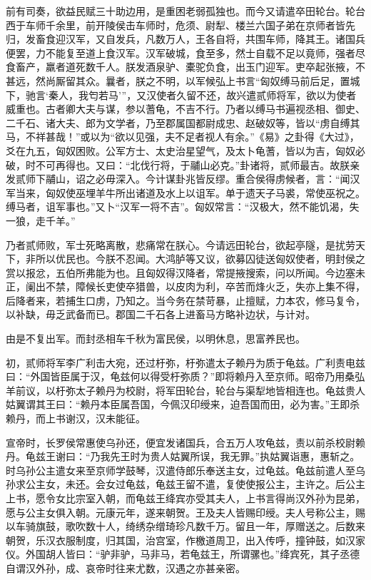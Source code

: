 \documentclass[]{article}
\begin{document}
前有司奏，欲益民赋三十助边用，是重困老弱孤独也。而今又请遣卒田轮台。轮台西于车师千余里，前开陵侯击车师时，危须、尉犁、楼兰六国子弟在京师者皆先归，发畜食迎汉军，又自发兵，凡数万人，王各自将，共围车师，降其王。诸国兵便罢，力不能复至道上食汉军。汉军破城，食至多，然士自载不足以竟师，强者尽食畜产，羸者道死数千人。朕发酒泉驴、橐驼负食，出玉门迎军。吏卒起张掖，不甚远，然尚厮留其众。曩者，朕之不明，以军候弘上书言``匈奴缚马前后足，置城下，驰言`秦人，我匄若马'''，又汉使者久留不还，故兴遣贰师将军，欲以为使者威重也。古者卿大夫与谋，参以蓍龟，不吉不行。乃者以缚马书遍视丞相、御史、二千石、诸大夫、郎为文学者，乃至郡属国都尉成忠、赵破奴等，皆以``虏自缚其马，不祥甚哉！''或以为``欲以见强，夫不足者视人有余。''《易》之卦得《大过》，爻在九五，匈奴困败。公军方士、太史治星望气，及太卜龟蓍，皆以为吉，匈奴必破，时不可再得也。又曰：``北伐行将，于鬴山必克。''卦诸将，贰师最吉。故朕亲发贰师下鬴山，诏之必毋深入。今计谋卦兆皆反缪。重合侯得虏候者，言：``闻汉军当来，匈奴使巫埋羊牛所出诸道及水上以诅军。单于遗天子马裘，常使巫祝之。缚马者，诅军事也。''又卜``汉军一将不吉''。匈奴常言：``汉极大，然不能饥渴，失一狼，走千羊。''

乃者贰师败，军士死略离散，悲痛常在朕心。今请远田轮台，欲起亭隧，是扰劳天下，非所以优民也。今朕不忍闻。大鸿胪等又议，欲募囚徒送匈奴使者，明封侯之赏以报忿，五伯所弗能为也。且匈奴得汉降者，常提掖搜索，问以所闻。今边塞未正，阑出不禁，障候长吏使卒猎兽，以皮肉为利，卒苦而烽火乏，失亦上集不得，后降者来，若捕生口虏，乃知之。当今务在禁苛暴，止擅赋，力本农，修马复令，以补缺，毋乏武备而已。郡国二千石各上进畜马方略补边状，与计对。

由是不复出军。而封丞相车千秋为富民侯，以明休息，思富养民也。

初，贰师将军李广利击大宛，还过杅弥，杅弥遣太子赖丹为质于龟兹。广利责电兹曰：``外国皆臣属于汉，龟兹何以得受杅弥质？''即将赖丹入至京师。昭帝乃用桑弘羊前议，以杅弥太子赖丹为校尉，将军田轮台，轮台与渠犁地皆相连也。龟兹贵人姑翼谓其王曰：``赖丹本臣属吾国，今佩汉印绶来，迫吾国而田，必为害。''王即杀赖丹，而上书谢汉，汉未能征。

宣帝时，长罗侯常惠使乌孙还，便宜发诸国兵，合五万人攻龟兹，责以前杀校尉赖丹。龟兹王谢曰：``乃我先王时为贵人姑翼所误，我无罪。''执姑翼诣惠，惠斩之。时乌孙公主遣女来至京师学鼓琴，汉遣侍郎乐奉送主女，过龟兹。龟兹前遣人至乌孙求公主女，未还。会女过龟兹，龟兹王留不遣，复使使报公主，主许之。后公主上书，愿令女比宗室入朝，而龟兹王绛宾亦受其夫人，上书言得尚汉外孙为昆弟，愿与公主女俱入朝。元康元年，遂来朝贺。王及夫人皆赐印绶。夫人号称公主，赐以车骑旗鼓，歌吹数十人，绮绣杂缯琦珍凡数千万。留且一年，厚赠送之。后数来朝贺，乐汉衣服制度，归其国，治宫室，作檄道周卫，出入传呼，撞钟鼓，如汉家仪。外国胡人皆曰：``驴非驴，马非马，若龟兹王，所谓骡也。''绛宾死，其子丞德自谓汉外孙，成、哀帝时往来尤数，汉遇之亦甚亲密。
\end{document}
